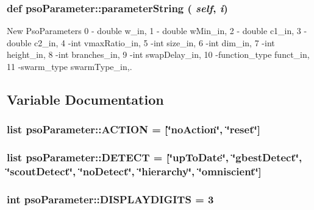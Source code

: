 \hypertarget{namespacepsoParameter_dbef2f523ebe62d1af2acaccdce72994}{
\subsubsection{\setlength{\rightskip}{0pt plus 5cm}def psoParameter::parameterString ( {\em self}, \/   {\em i})}}
\label{namespacepsoParameter_dbef2f523ebe62d1af2acaccdce72994}


New PsoParameters 0 - double w\_\-in, 1 - double wMin\_\-in, 2 - double c1\_\-in, 3 - double c2\_\-in, 4 -int vmaxRatio\_\-in, 5 -int size\_\-in, 6 -int dim\_\-in, 7 -int height\_\-in, 8 -int branches\_\-in, 9 -int swapDelay\_\-in, 10 -function\_\-type funct\_\-in, 11 -swarm\_\-type swarmType\_\-in,. 



\subsection{Variable Documentation}
\hypertarget{namespacepsoParameter_5a19c0c85591e50181f25d79d0fd1484}{
\subsubsection{\setlength{\rightskip}{0pt plus 5cm}list {\bf psoParameter::ACTION} = \mbox{[}\char`\"{}noAction\char`\"{}, \char`\"{}reset\char`\"{}\mbox{]}}}
\label{namespacepsoParameter_5a19c0c85591e50181f25d79d0fd1484}


\hypertarget{namespacepsoParameter_c3a16f0779048e976fb7b3cd433341cc}{
\subsubsection{\setlength{\rightskip}{0pt plus 5cm}list {\bf psoParameter::DETECT} = \mbox{[}\char`\"{}upToDate\char`\"{}, \char`\"{}gbestDetect\char`\"{}, \char`\"{}scoutDetect\char`\"{}, \char`\"{}noDetect\char`\"{}, \char`\"{}hierarchy\char`\"{}, \char`\"{}omniscient\char`\"{}\mbox{]}}}
\label{namespacepsoParameter_c3a16f0779048e976fb7b3cd433341cc}


\hypertarget{namespacepsoParameter_1d199c6e031504b8d49ff109bd54cbeb}{
\subsubsection{\setlength{\rightskip}{0pt plus 5cm}int {\bf psoParameter::DISPLAYDIGITS} = 3}}
\label{namespacepsoParameter_1d199c6e031504b8d49ff109bd54cbeb}


